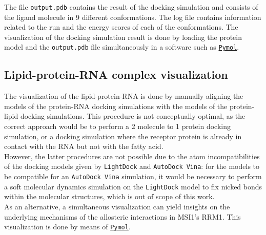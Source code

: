 The file \texttt{output.pdb} contains the result of the docking simulation and consists of the ligand molecule in 9 different conformations. The log file contains information related to the run and the energy scores of each of the conformations. The visualization of the docking simulation result is done by loading the protein model and the \texttt{output.pdb} file simultaneously in a software such as \href{https://pymol.org/2/}{\texttt{Pymol}}.

\subsection{Lipid-protein-RNA complex visualization}

The visualization of the lipid-protein-RNA is done by manually aligning the models of the protein-RNA docking simulations with the models of the protein-lipid docking simulations. This procedure is not conceptually optimal, as the correct approach would be to perform a 2 molecule to 1 protein docking simulation, or a docking simulation where the receptor protein is already in contact with the RNA but not with the fatty acid.\\

However, the latter procedures are not possible due to the atom incompatibilities of the docking models given by \texttt{LightDock} and \texttt{AutoDock Vina}: for the models to be compatible for an \texttt{AutoDock Vina} simulation, it would be necessary to perform a soft molecular dynamics simulation on the \texttt{LightDock} model to fix nicked bonds within the molecular structures, which is out of scope of this work.\\

As an alternative, a simultaneous visualization can yield insights on the underlying mechanisms of the allosteric interactions in MSI1's RRM1. This visualization is done by means of \href{https://pymol.org/2/}{\texttt{Pymol}}.
